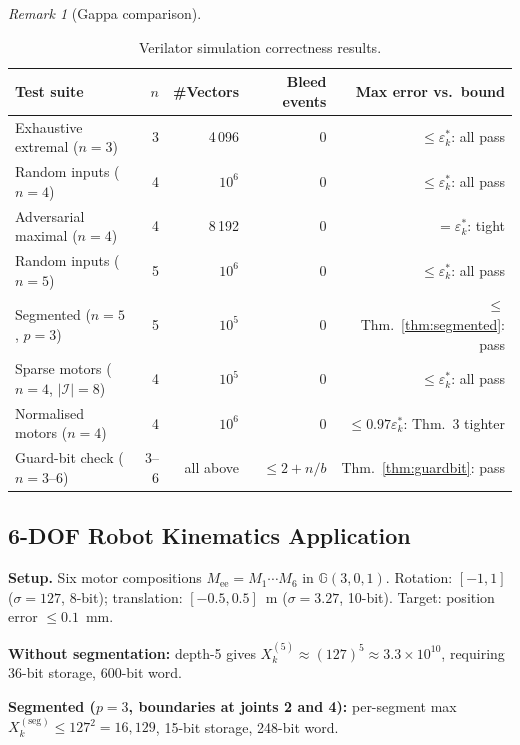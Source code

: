 \documentclass[11pt,a4paper]{article}
\theoremstyle{definition}
\theoremstyle{plain}
\theoremstyle{remark}
\newtheorem{remark}{Remark}[section]
\newcommand{\GA}{\mathbb{G}}
\begin{document}
\begin{remark}[Gappa comparison]
\begin{table}[h]
\centering
\caption{Verilator simulation correctness results.}
\label{tab:correctness}
\begin{tabular}{lrrrr}
\toprule
Test suite & $n$ & \#Vectors & Bleed events & Max error vs.\ bound \\
\midrule
Exhaustive extremal ($n=3$) & 3 & 4\,096 & 0 & $\le\varepsilon_k^*$: all pass \\
Random inputs ($n=4$) & 4 & $10^6$ & 0 & $\le\varepsilon_k^*$: all pass \\
Adversarial maximal ($n=4$) & 4 & 8\,192 & 0 & $=\varepsilon_k^*$: tight \\
Random inputs ($n=5$) & 5 & $10^6$ & 0 & $\le\varepsilon_k^*$: all pass \\
Segmented ($n=5$, $p=3$) & 5 & $10^5$ & 0 & $\le$ Thm.~\ref{thm:segmented}: pass \\
Sparse motors ($n=4$, $|\mathcal{I}|=8$) & 4 & $10^5$ & 0 & $\le\varepsilon_k^*$: all pass \\
Normalised motors ($n=4$) & 4 & $10^6$ & 0 & $\le0.97\varepsilon_k^*$: Thm.~3 tighter \\
Guard-bit check ($n=3$--$6$) & 3--6 & all above & $\le 2+n/b$ & Thm.~\ref{thm:guardbit}: pass \\
\bottomrule
\end{tabular}
\end{table}

\subsection{6-DOF Robot Kinematics Application}
\label{sec:app-robot}

\textbf{Setup.} Six motor compositions $M_\mathrm{ee} = M_1\cdots M_6$
in $\GA(3,0,1)$.
Rotation: $[-1,1]$ ($\sigma=127$, 8-bit);
translation: $[-0.5,0.5]$~m ($\sigma=3.27$, 10-bit).
Target: position error $\le0.1$~mm.

\textbf{Without segmentation:} depth-5 gives $X_k^{(5)}\approx(127)^5\approx3.3\times10^{10}$, requiring 36-bit storage, 600-bit word.

\textbf{Segmented ($p=3$, boundaries at joints 2 and 4):} per-segment max $X_k^{(\text{seg})}\le127^2=16{,}129$, 15-bit storage, 248-bit word.


\end{remark}
\end{document}
